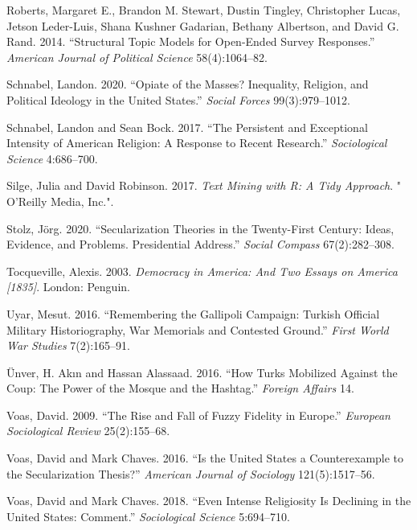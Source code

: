 \documentclass[
  12pt,
]{article}
\begin{document}
\leavevmode\hypertarget{ref-roberts2014structural}{}%
Roberts, Margaret E., Brandon M. Stewart, Dustin Tingley, Christopher Lucas, Jetson Leder-Luis, Shana Kushner Gadarian, Bethany Albertson, and David G. Rand. 2014. ``Structural Topic Models for Open-Ended Survey Responses.'' \emph{American Journal of Political Science} 58(4):1064--82.

\leavevmode\hypertarget{ref-Sch21}{}%
Schnabel, Landon. 2020. ``Opiate of the Masses? Inequality, Religion, and Political Ideology in the United States.'' \emph{Social Forces} 99(3):979--1012.

\leavevmode\hypertarget{ref-schnabel2017persistent}{}%
Schnabel, Landon and Sean Bock. 2017. ``The Persistent and Exceptional Intensity of American Religion: A Response to Recent Research.'' \emph{Sociological Science} 4:686--700.

\leavevmode\hypertarget{ref-silge2017text}{}%
Silge, Julia and David Robinson. 2017. \emph{Text Mining with R: A Tidy Approach}. " O'Reilly Media, Inc.".

\leavevmode\hypertarget{ref-Sto20}{}%
Stolz, Jörg. 2020. ``Secularization Theories in the Twenty-First Century: Ideas, Evidence, and Problems. Presidential Address.'' \emph{Social Compass} 67(2):282--308.

\leavevmode\hypertarget{ref-tocqueville2003democracy}{}%
Tocqueville, Alexis. 2003. \emph{Democracy in America: And Two Essays on America {[}1835{]}}. London: Penguin.

\leavevmode\hypertarget{ref-uyar2016remembering}{}%
Uyar, Mesut. 2016. ``Remembering the Gallipoli Campaign: Turkish Official Military Historiography, War Memorials and Contested Ground.'' \emph{First World War Studies} 7(2):165--91.

\leavevmode\hypertarget{ref-unver2016turks}{}%
Ünver, H. Akın and Hassan Alassaad. 2016. ``How Turks Mobilized Against the Coup: The Power of the Mosque and the Hashtag.'' \emph{Foreign Affairs} 14.

\leavevmode\hypertarget{ref-voas2009rise}{}%
Voas, David. 2009. ``The Rise and Fall of Fuzzy Fidelity in Europe.'' \emph{European Sociological Review} 25(2):155--68.

\leavevmode\hypertarget{ref-voas2016united}{}%
Voas, David and Mark Chaves. 2016. ``Is the United States a Counterexample to the Secularization Thesis?'' \emph{American Journal of Sociology} 121(5):1517--56.

\leavevmode\hypertarget{ref-voas2018even}{}%
Voas, David and Mark Chaves. 2018. ``Even Intense Religiosity Is Declining in the United States: Comment.'' \emph{Sociological Science} 5:694--710.
\end{document}
